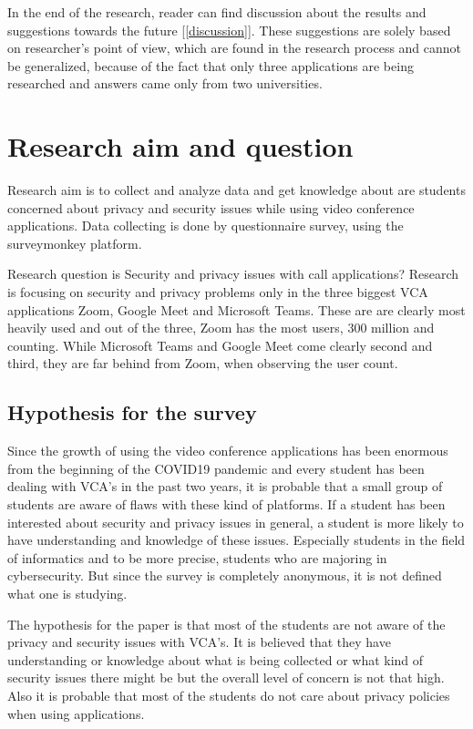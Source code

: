\documentclass[utf8,english]{gradu3}
\begin{document}
%
In the end of the research, reader can find discussion about the results and suggestions towards the future [\ref{discussion}]. These suggestions are solely based on researcher's point of view, which are found in the research process and cannot be generalized, because of the fact that only three applications are being researched and answers came only from two universities.


\chapter{Research aim and question}
\label{researchquestion}
Research aim is to collect and analyze data and get knowledge about are students concerned about privacy and security issues while using video conference applications. Data collecting is done by questionnaire survey, using the surveymonkey platform.

Research question is Security and privacy issues with call applications?
Research is focusing on security and privacy problems only in the three biggest VCA applications Zoom, Google Meet and Microsoft Teams. These are are clearly most heavily used and out of the three, Zoom has the most users, 300 million and counting. While Microsoft Teams and Google Meet come clearly second and third, they are far behind from Zoom, when observing the user count.

\section{Hypothesis for the survey}
Since the growth of using the video conference applications has been enormous from the beginning of the COVID19 pandemic and every student has been dealing with VCA's in the past two years, it is probable that a small group of students are aware of flaws with these kind of platforms. If a student has been interested about security and privacy issues in general, a student is more likely to have understanding and knowledge of these issues. Especially students in the field of informatics and to be more precise, students who are majoring in cybersecurity. But since the survey is completely anonymous, it is not defined what one is studying.

The hypothesis for the paper is that most of the students are not aware of the privacy and security issues with VCA's. It is believed that they have understanding or knowledge about what is being collected or what kind of security issues there might be but the overall level of concern is not that high. Also it is probable that most of the students do not care about privacy policies when using applications.
\end{document}
